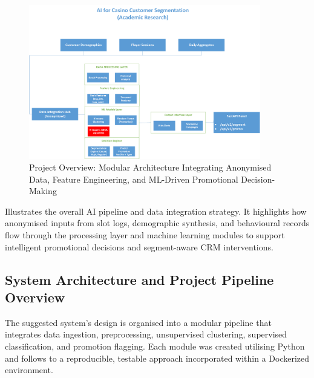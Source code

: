 \documentclass[12pt,a4paper]{report}
\begin{document}
\begin{figure}[H]
\centering
\includegraphics[width=0.9\textwidth]{figures/project_overview_diagram.png}
\caption{Project Overview: Modular Architecture Integrating Anonymised Data, Feature Engineering, and ML-Driven Promotional Decision-Making}
\label{fig:overview and scope}
\end{figure}

Illustrates the overall AI pipeline and data integration strategy. It highlights how anonymised inputs from slot logs, demographic synthesis, and behavioural records flow through the processing layer and machine learning modules to support intelligent promotional decisions and segment-aware CRM interventions.

\subsection{System Architecture and Project Pipeline Overview}
The suggested system's design is organised into a modular pipeline that integrates data ingestion, preprocessing, unsupervised clustering, supervised classification, and promotion flagging. Each module was created utilising Python and follows to a reproducible, testable approach incorporated within a Dockerized environment.
\end{document}
